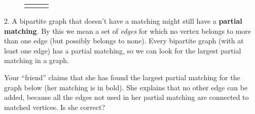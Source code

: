 \documentclass[10pt,]{book}
\newcommand{\terminology}[1]{\textbf{#1}}
\theoremstyle{plain}
\theoremstyle{definition}
\numberwithin{equation}{chapter}
\newlength{\panelmax}
\newcommand{\vtx}[2]{node[fill,circle,inner sep=0pt, minimum size=4pt,label=#1:#2]{}}
\renewcommand{\v}{\vtx{above}{}}
\begin{document}
\begin{exerciselist}
{{{{
}
}}
\newlength{\phAWimage}\setlength{\phAWimage}{\ht\panelboxAWimage+\dp\panelboxAWimage}
\settototalheight{\phAWimage}{\usebox{\panelboxAWimage}}
\setlength{\panelmax}{\maxof{\panelmax}{\phAWimage}}
\leavevmode%
\setlength{\tabcolsep}{0.0166666666666667\textwidth}
\begin{figure}
\hspace*{0.0166666666666667\textwidth}%
\begin{tabular}{@{}*{3}{c}@{}}
\begin{minipage}[c][\panelmax][b]{0.2\textwidth}\usebox{\panelboxAUimage}\end{minipage}&
\begin{minipage}[c][\panelmax][b]{0.3\textwidth}\usebox{\panelboxAVimage}\end{minipage}&
\begin{minipage}[c][\panelmax][b]{0.4\textwidth}\usebox{\panelboxAWimage}\end{minipage}\end{tabular}
\end{figure}
}%


\par\smallskip
\item[2.]\hypertarget{exercise-315}{}
        A bipartite graph that doesn't have a matching might still have a \terminology{partial matching}. By this we mean a set of \emph{edges} for which no vertex belongs to more than one edge (but possibly belongs to none). Every bipartite graph (with at least one edge) has a partial matching, so we can look for the largest partial matching in a graph.
\par

        Your ``friend'' claims that she has found the largest partial matching for the graph below (her matching is in bold). She explains that no other edge can be added, because all the edges not used in her partial matching are connected to matched vertices. Is she correct?

        \leavevmode%
\begin{figure}
\centering
{
}
\end{figure}


\end{exerciselist}
\end{document}
